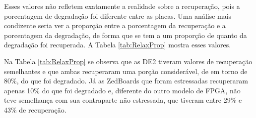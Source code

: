 

Esses valores não refletem exatamente a realidade sobre a recuperação, pois a porcentagem de degradação foi diferente entre as placas. Uma análise mais condizente seria ver a proporção entre a porcentagem da recuperação e a porcentagem da degradação, de forma que se tem a um proporção de quanto da degradação foi recuperada. A Tabela \ref{tab:RelaxProp} mostra esses valores.



Na Tabela \ref{tab:RelaxProp} se observa que as DE2 tiveram valores de recuperação semelhantes e que ambas recuperaram uma porção considerável, de em torno de 80\%, do que foi degradado. Já as ZedBoards que foram estressadas recuperaram apenas 10\% do que foi degradado e, diferente do outro modelo de FPGA, não teve semelhança com sua contraparte não estressada, que tiveram entre 29\% e 43\% de recuperação. 


